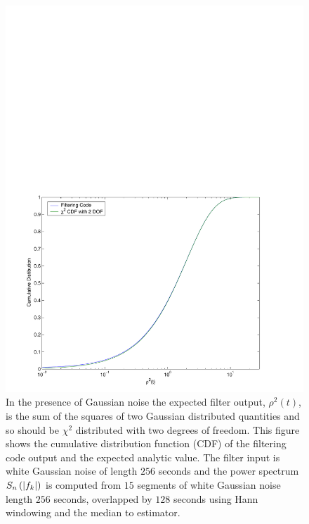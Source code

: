 \begin{figure}[htb]
\label{f:rhosq_median_cdf}
\begin{center}
\includegraphics[width=\linewidth]{figures/findchirp/rhosq_gaussian_cdf}
\end{center}
\caption{%
In the presence of Gaussian noise the expected filter output, $\rho^2(t)$, is
the sum of the squares of two Gaussian distributed quantities and so should be
$\chi^2$ distributed with two degrees of freedom. This figure shows the
cumulative distribution function (CDF) of the filtering code output and the
expected analytic value. The filter input is white Gaussian noise of length
$256$ seconds and the power spectrum $S_n\left(\left|f_{k}\right|\right)$ is computed from $15$ segments
of white Gaussian noise length $256$ seconds, overlapped by $128$ seconds
using Hann windowing and the median to estimator.
}
\end{figure}

